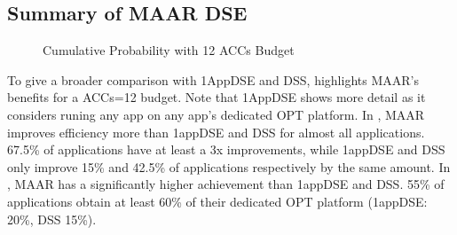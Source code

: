 \vspace{-2pt}
\subsection{Summary of MAAR DSE}
\label{subsec:res-sum}

\begin{figure}[h]
\vspace{-10pt}
	\centering
		\hfill
		\vspace{-8pt}
	\caption{Cumulative Probability with 12 ACCs Budget}
	\label{fig:all12}
		\vspace{-0pt}
\end{figure}

To give a broader comparison with 1AppDSE and DSS, 
 highlights MAAR's benefits for a ACCs=12 budget. Note that 1AppDSE shows more detail as it considers runing any app on any app's dedicated OPT platform. In , MAAR improves efficiency more than 1appDSE and DSS for almost all applications. 
67.5\% of applications have at least a 3x improvements, while 1appDSE and DSS only improve 15\% and 42.5\% of applications respectively by the same amount. In , MAAR has a significantly higher achievement than 1appDSE and DSS. 55\% of applications obtain at least 60\% of their dedicated OPT platform (1appDSE: 20\%, DSS 15\%).

